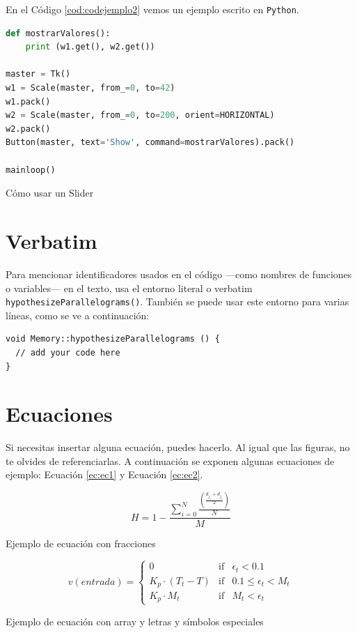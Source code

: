 En el Código \ref{cod:codejemplo2} vemos un ejemplo escrito en \texttt{Python}.

\begin{code}[h]
\begin{lstlisting}[language=Python]
def mostrarValores():
    print (w1.get(), w2.get())

master = Tk()
w1 = Scale(master, from_=0, to=42)
w1.pack()
w2 = Scale(master, from_=0, to=200, orient=HORIZONTAL)
w2.pack()
Button(master, text='Show', command=mostrarValores).pack()

mainloop()
\end{lstlisting}
\caption[Cómo usar un Slider]{Cómo usar un Slider}
\label{cod:codejemplo2}
\end{code}

\section{Verbatim}

Para mencionar identificadores usados en el código ---como nombres de funciones o variables--- en el texto, usa el entorno literal o verbatim \verb|hypothesizeParallelograms()|. También se puede usar este entorno para varias líneas, como se ve a continuación:

\begin{verbatim}
void Memory::hypothesizeParallelograms () {
  // add your code here
}
\end{verbatim}

\section{Ecuaciones}

Si necesitas insertar alguna ecuación, puedes hacerlo. Al igual que las figuras, no te olvides de referenciarlas. A continuación se exponen algunas ecuaciones de ejemplo: Ecuación \ref{ec:ec1} y Ecuación \ref{ec:ec2}.

\begin{myequation}[h]
\begin{equation}
H = 1 - \frac{\sum_{i=0}^{N}\frac{(\frac{d_{j_s} + d_{j_e}}{2})}{N}}{M}
\nonumber
\label{ec:ec1}
\end{equation}
\caption[Ejemplo de ecuación con fracciones]{Ejemplo de ecuación con fracciones}
\end{myequation} 

\begin{myequation}[h]
\begin{equation}
v(entrada)= \left\{
	\begin{array}{lcc}
		0 & \mbox{if} & \epsilon_t < 0.1\\
		K_p\cdot{(T_{t}-T)} & \mbox{if}& 0.1 \leq \epsilon_t < M_t\\
		K_p \cdot M_t & \mbox{if}& M_t < \epsilon_t
	\end{array}
\right.
\label{ec:ec2}
\end{equation}
\caption[Ejemplo de ecuación con array y letras y símbolos especiales]{Ejemplo de ecuación con array y letras y símbolos especiales}
\end{myequation}

